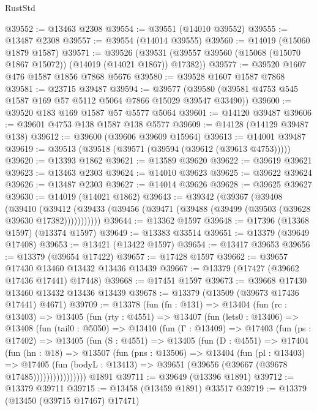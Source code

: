 \begin{lexlean}{RustStd}
\begin{coremodule}
@39552 := @13463 @2308
@39554 := @39551 (@14010 @39552)
@39555 := @13487 @2308
@39557 := @39554 (@14014 @39555)
@39560 := @14019 (@15060 @1879 @1587)
@39571 := @39526
    (@39531 (@39557 @39560 (@15068 (@15070 @1867 @15072)) (@14019 (@14021 @1867)) @17382))
@39577 := @39520 @1607 @476 @1587 @1856 @7868 @5676
@39580 := @39528 @1607 @1587 @7868
@39581 := @23715 @39487
@39594 := @39577 (@39580 (@39581 @4753 @545 @1587 @169 @57 @5112 @5064 @7866 @15029 @39547 @33490))
@39600 := @39520 @183 @169 @1587 @57 @5577 @5064
@39601 := @14120 @39487
@39606 := @39601 @4753 @138 @1587 @138 @5577
@39609 := @14128 (@14129 @39487 @138)
@39612 := @39600 (@39606 @39609 @15964)
@39613 := @14001 @39487
@39619 := @39513 (@39518 (@39571 (@39594 (@39612 (@39613 @4753)))))
@39620 := @13393 @1862
@39621 := @13589 @39620
@39622 := @39619 @39621
@39623 := @13463 @2303
@39624 := @14010 @39623
@39625 := @39622 @39624
@39626 := @13487 @2303
@39627 := @14014 @39626
@39628 := @39625 @39627
@39630 := @14019 (@14021 @1862)
@39643 := @39342
    (@39367
      (@39408
        (@39410
          (@39412 (@39433 (@39456 (@39471 (@39488 (@39499 (@39503 (@39628 @39630 @17382)))))))))))
@39644 := @13362 @1597
@39648 := @17396 (@13368 @1597) (@13374 @1597)
@39649 := @13383 @33514
@39651 := @13379 (@39649 @17408)
@39653 := @13421 (@13422 @1597)
@39654 := @13417 @39653
@39656 := @13379 (@39654 @17422)
@39657 := @17428 @1597
@39662 := @39657 @17430 @13460 @13432 @13436 @13439
@39667 := @13379 (@17427 (@39662 @17436 @17441) @17448)
@39668 := @17451 @1597
@39673 := @39668 @17430 @13460 @13432 @13436 @13439
@39678 := @13379 (@13509 (@39673 @17436 @17441) @4671)
@39709 := @13378
    (fun (fn : @131) =>
    @13404
      (fun (rc : @13403) =>
      @13405
        (fun (rty : @4551) =>
        @13407
          (fun (lets0 : @13406) =>
          @13408
            (fun (tail0 : @5050) =>
            @13410
              (fun (Γ : @13409) =>
              @17403
                (fun (ps : @17402) =>
                @13405
                  (fun (S : @4551) =>
                  @13405
                    (fun (D : @4551) =>
                    @17404
                      (fun (hn : @18) =>
                      @13507
                        (fun (pns : @13506) =>
                        @13404
                          (fun (pl : @13403) =>
                          @17405
                            (fun (bodyL : @13413) =>
                            @39651 (@39656 (@39667 (@39678 @17485))))))))))))))))
    @1891
@39711 := @39649 (@13396 @1891)
@39712 := @13379 @39711
@39715 := @13458 (@13459 @1891) @33517
@39719 := @13379 (@13450 (@39715 @17467) @17471)

\end{coremodule}
\end{lexlean}
